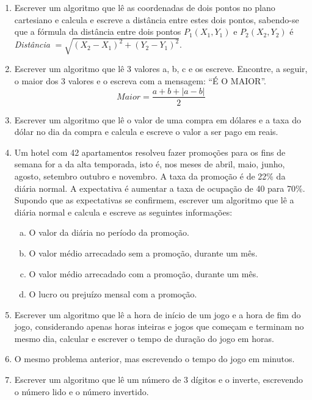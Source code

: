 \documentclass[onecolumn,a4paper,10pt]{report}
\newcommand{\+}{\, + \,}
\newcommand{\<}{\hspace*{-0.4cm}}
\begin{document}
\begin{enumerate}[1.]
\item Escrever um algoritmo que lê as coordenadas de dois pontos no plano cartesiano e calcula e escreve a distância
entre estes dois pontos, sabendo-se que a fórmula da distância entre dois pontos $P_1(X_1,Y_1)$ e $P_2(X_2,Y_2)$ é\\
\emph{Distância} $= \sqrt{ ( X_2 - X_1 )^2 + ( Y_2 - Y_1 )^2 }$.

\item Escrever um algoritmo que lê 3 valores a, b, c e os escreve. Encontre, a seguir, o maior dos 3 valores e o
escreva com a mensagem: ``É O MAIOR''.
\[Maior = \frac{a + b + | a - b |}{2}\]

\item Escrever um algoritmo que lê o valor de uma compra em dólares e a taxa do dólar no dia da compra e calcula e
escreve o valor a ser pago em reais.

\item Um hotel com 42 apartamentos resolveu fazer promoções para os fins de semana for a da alta temporada, isto
é, nos meses de abril, maio, junho, agosto, setembro outubro e novembro. A taxa da promoção é de 22\% da
diária normal. A expectativa é aumentar a taxa de ocupação de 40 para 70\%. Supondo que as expectativas se
confirmem, escrever um algoritmo que lê a diária normal e calcula e escreve as seguintes informações:
\begin{enumerate}[a)]
	\item O valor da diária no período da promoção.
	\item O valor médio arrecadado sem a promoção, durante um mês.
	\item O valor médio arrecadado com a promoção, durante um mês.
	\item O lucro ou prejuízo mensal com a promoção.
\end{enumerate}

\item Escrever um algoritmo que lê a hora de início de um jogo e a hora de fim do jogo, considerando apenas horas
inteiras e jogos que começam e terminam no mesmo dia, calcular e escrever o tempo de duração do jogo em
horas.

\item O mesmo problema anterior, mas escrevendo o tempo do jogo em minutos.

\item Escrever um algoritmo que lê um número de 3 dígitos e o inverte, escrevendo o número lido e o número invertido.

\end{enumerate}

~\\

\end{document}
